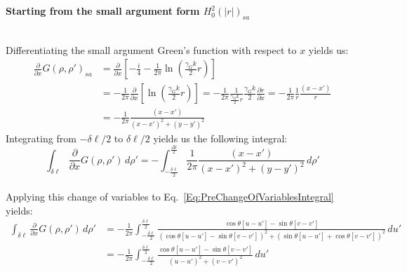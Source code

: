 \documentclass{article}
\newcommand{\0}{\varnothing}
\begin{document}
\  \\
\pagebreak
{\ \\ \centering \bf Starting from the small argument form $H_0^2(|r|)_{sa}$\ \\\ \\}

Differentiating the small argument Green's function with respect to $x$ yields us:
\begin{align*}
    \frac{\partial}{\partial x} G(\rho, \rho')_{sa} &= \frac{\partial}{\partial x} \left[ -\frac{i}{4} - \frac{1}{2\pi}\ln\left(\frac{\gamma_G k}{2} r \right) \right]\\
    &= - \frac{1}{2\pi}\frac{\partial}{\partial x} \left[\ln\left(\frac{\gamma_G k}{2} r \right) \right] = - \frac{1}{2\pi}\frac{1}{\frac{\gamma_G k}{2} r} \frac{\gamma_G k}{2} \frac{\partial r}{\partial x} = - \frac{1}{2\pi}\frac{1}{r}  \frac{(x-x')}{r} \\
    &=-\frac{1}{2\pi} \frac{(x-x')}{(x-x')^2+(y-y')^2}
\end{align*}
Integrating from $-\delta \ell/2$ to $\delta \ell/2$ yields us the following integral:
\begin{equation}\label{Eq:PreChangeOfVariablesIntegralX}
    \int_{\delta\ell}\frac{\partial}{\partial x}G(\rho,\rho')\, d\rho' = - \int_{-\frac{\delta \ell}{2}}^{\frac{\Delta l}{2}} \frac{1}{2\pi} \frac{(x-x')}{(x-x')^2+(y-y')^2}\, d\rho'
\end{equation}
\ \\

Applying this change of variables to Eq.~\eqref{Eq:PreChangeOfVariablesIntegral} yields:
\begin{align*}
    \int_{\delta\ell}\frac{\partial}{\partial x}G(\rho,\rho')\, d\rho' &= -\frac{1}{2\pi}\int_{-\frac{\delta \ell}{2}}^{\frac{\delta \ell}{2}}\frac{\cos{\theta}[u-u'] - \sin{\theta}[v-v']}
    {(\cos{\theta}[u-u'] - \sin{\theta}[v-v'])^2 + (\sin{\theta}[u-u'] + \cos{\theta}[v-v'])^2}\,du' \\
    &= -\frac{1}{2\pi}\int_{-\frac{\delta \ell}{2}}^{\frac{\delta \ell}{2}}\frac{\cos{\theta}[u-u'] - \sin{\theta}[v-v']}{(u-u')^2 + (v-v')^2}\,du'
\end{align*}
\end{document}
